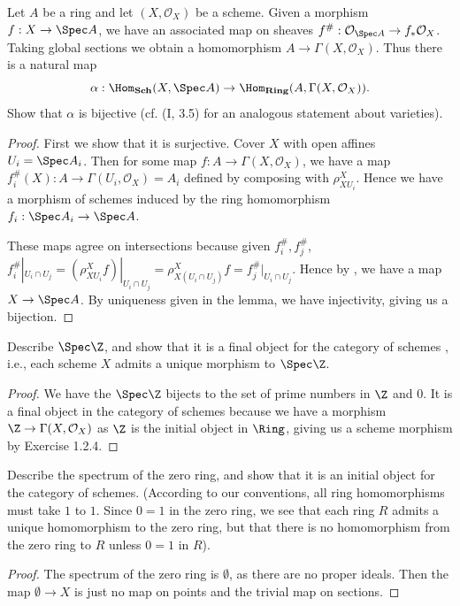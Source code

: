 \begin{exercise}%
	Let $A $ be a ring and let $(X,\mathcal{O}_X) $ be a scheme. Given a morphism $f: X\to \Spec A $, we have an associated map on sheaves $f^\#: \mathcal{O}_{\Spec A} \to f_\ast \mathcal{O}_X $. Taking global sections we obtain a homomorphism $A\to \Gamma(X,\mathcal{O}_X) $. Thus there is a natural map
	\[
		\alpha: \Hom_{\text{\textbf{Sch}}}(X,\Spec A) \to \Hom_{\text{\textbf{Ring}}}(A,\Gamma(X,\mathcal{O}_X))
	.\]
	Show that $\alpha $ is bijective (cf. (I, 3.5) for an analogous statement about varieties).
\end{exercise}
\begin{proof}
	First we show that it is surjective.
	Cover $X $ with open affines $U_i = \Spec A_i $.
	Then for some map $f: A\to \Gamma(X,\mathcal{O}_X) $, we have a map $f^\#_i(X):A\to \Gamma(U_i, \mathcal{O}_X) = A_i $ defined by composing with $\rho^X_{XU_i} $.
	Hence we have a morphism of schemes induced by the ring homomorphism $f_i: \Spec A_i \to \Spec A $.

	These maps agree on intersections because given $f_i^\#,f_j^\# $, $f_i^\#|_{U_i \cap U_j} = (\rho^X_{X U_i}f)|_{U_i\cap U_j} = \rho^X_{X (U_i\cap U_j)}f = f_j^\#|_{U_i\cap U_j}$.
	Hence by , we have a map $X\to \Spec A $.
	By uniqueness given in the lemma, we have injectivity, giving us a bijection.
\end{proof}

\begin{exercise}%
	Describe $\Spec \Z $, and show that it is a final object for the category of schemes , i.e., each scheme $X $ admits a unique morphism to $\Spec \Z $.
\end{exercise}
\begin{proof}
	We have the $\Spec \Z $ bijects to the set of prime numbers in $\Z $ and $0 $.
	It is a final object in the category of schemes because we have a morphism $\Z \to \Gamma(X, \mathcal{O}_X) $ as $\Z $ is the initial object in $\Ring $, giving us a scheme morphism by Exercise 1.2.4.
\end{proof}

\begin{exercise}
	Describe the spectrum of the zero ring, and show that it is an initial object for the category of schemes. (According to our conventions, all ring homomorphisms must take $1 $ to $1 $. Since $0 = 1 $ in the zero ring, we see that each ring $R $ admits a unique homomorphism to the zero ring, but that there is no homomorphism from the zero ring to $R $ unless $0=1 $ in $R $).
\end{exercise}
\begin{proof}
	The spectrum of the zero ring is $\emptyset $, as there are no proper ideals.
	Then the map $\emptyset \to X $ is just no map on points and the trivial map on sections.
\end{proof}

